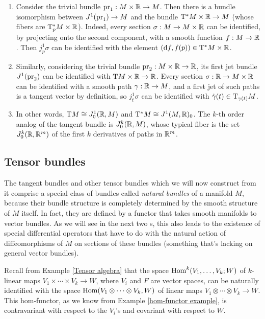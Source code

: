 \begin{example}
    \begin{enumerate}
        \item Consider the trivial bundle $\operatorname{pr}_1:M\times\mathbb{R}\to M$. Then there is a bundle isomorphism between $J^1(\operatorname{pr}_1)\to M$ and the bundle $\mathrm{T}^\ast M\times \mathbb{R}\to M$ (whose fibers are $\mathrm{T}^\ast_pM\times\mathbb{R}$). Indeed, every section $\sigma:M\to M\times\mathbb{R}$ can be identified, by projecting onto the second component, with a smooth function $f:M\to \mathbb{R}$. Then $j^1_p\sigma$ can be identified with the element $({\mathrm{d}} f,f(p))\in \mathrm{T}^\ast M\times \mathbb{R}$.
        
        \item Similarly, considering the trivial bundle $\operatorname{pr}_2:M\times \mathbb{R}\to \mathbb{R}$, its first jet bundle $J^1(\operatorname{pr}_2)$ can be identified with $\mathrm{T} M\times \mathbb{R}\to \mathbb{R}$. Every section $\sigma:\mathbb{R}\to M\times\mathbb{R}$ can be identified with a smooth path $\gamma:\mathbb{R}\to M$, and a first jet of such paths is a tangent vector by definition, so $j^1_t\sigma$ can be identified with $\dot\gamma(t)\in \mathrm{T}_{\gamma(t)}M$.

        \item In other words, $\mathrm{T} M\cong J^1_0(\mathbb{R},M)$ and $\mathrm{T}^\ast M\cong J^1(M,\mathbb{R})_0$. The $k$-th order analog of the tangent bundle is $J^k_0(\mathbb{R},M)$, whose typical fiber is the set $J_0^k(\mathbb{R},\mathbb{R}^m)$ of the first $k$ derivatives of paths in $\mathbb{R}^m$.
    \end{enumerate}
\end{example}





\subsection{Tensor bundles}


The tangent bundles and other tensor bundles which we will now construct from it comprise a special class of bundles called \emph{natural bundles} of a manifold $M$, because their bundle structure is completely determined by the smooth structure of $M$ itself. In fact, they are defined by a functor that takes smooth manifolds to vector bundles. As we will see in the next two \subsect s, this also leads to the existence of special differential operators that have to do with the natural action of diffeomorphisms of $M$ on sections of these bundles (something that's lacking on general vector bundles).


Recall from Example \ref{Tensor algebra} that the space $\operatorname{Hom}^k(V_1,\ldots,V_k;W)$ of $k$-linear maps $V_1\times \cdots\times V_k\to W$, where $V_i$ and $F$ are vector spaces, can be naturally identified with the space $\operatorname{Hom}(V_1\otimes\cdots\otimes V_k,W)$ of linear maps $V_1\otimes \cdots\otimes V_k\to W$. This hom-functor, as we know from Example \ref{hom-functor example}, is contravariant with respect to the $V_i$'s and covariant with respect to $W$. 

